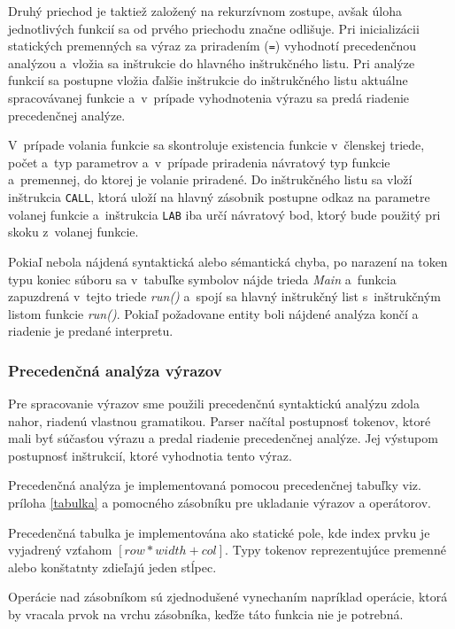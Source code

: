 \documentclass[11pt,a4paper]{article}
\begin{document}
	Druhý priechod je taktiež založený na rekurzívnom zostupe, avšak úloha
	jednotlivých funkcií sa od prvého priechodu značne odlišuje.
	Pri inicializácii statických premenných sa výraz za priradením (\texttt{=})
	vyhodnotí precedenčnou analýzou a~vložia sa inštrukcie do hlavného
	inštrukčného listu. Pri analýze funkcií sa postupne vložia ďalšie inštrukcie
	do inštrukčného listu aktuálne spracovávanej funkcie a~v~prípade vyhodnotenia
	výrazu  sa predá riadenie precedenčnej analýze.

	V~prípade volania funkcie sa skontroluje existencia funkcie v~členskej
	triede, počet a~typ parametrov a~v~prípade priradenia  návratový typ
	funkcie a~premennej, do ktorej je volanie priradené. Do inštrukčného
	listu sa vloží inštrukcia \texttt{CALL}, ktorá uloží na hlavný zásobnik
	postupne odkaz na parametre volanej funkcie a~inštrukcia \texttt{LAB}
	iba určí návratový bod, ktorý bude použitý pri skoku z~volanej funkcie.

	Pokiaľ nebola nájdená syntaktická alebo sémantická chyba, po narazení na
	token typu koniec súboru sa v~tabuľke symbolov nájde trieda \emph{Main}
	a~funkcia zapuzdrená v~tejto triede \emph{run()} a~spojí sa hlavný inštrukčný
	list s~inštrukčným listom funkcie \emph{run()}. Pokiaľ požadovane entity
	boli nájdené analýza končí a riadenie je predané interpretu.

	\subsubsection{Precedenčná analýza výrazov}
	\label{precedencna analyza}

	Pre spracovanie výrazov sme použili precedenčnú syntaktickú analýzu zdola nahor,
	riadenú vlastnou gramatikou.
	Parser načítal postupnosť tokenov, ktoré mali byť súčasťou výrazu a predal
	riadenie precedenčnej analýze. Jej výstupom postupnosť inštrukcií, ktoré vyhodnotia tento výraz.

	Precedenčná analýza je implementovaná pomocou precedenčnej tabuľky viz.
	príloha \ref{tabulka} a pomocného zásobníku pre ukladanie výrazov a operátorov.

	Precedenčná tabulka je implementována ako statické pole, kde index prvku je vyjadrený vzťahom $[row * width + col]$.
	Typy tokenov reprezentujúce premenné alebo konštatnty zdieľajú jeden stĺpec.

	Operácie nad zásobníkom sú zjednodušené vynechaním napríklad operácie, ktorá by
	vracala prvok na vrchu zásobníka, keďže táto funkcia nie je potrebná.
\end{document}
